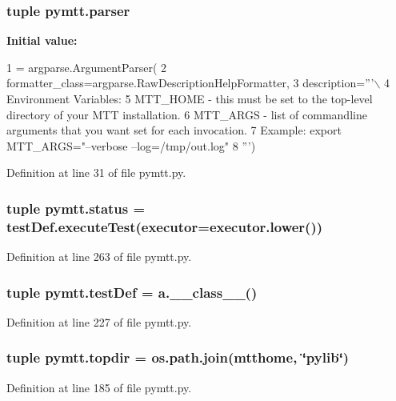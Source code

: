 \hypertarget{namespacepymtt_a95d54fdad48aac280be9d57cf81dee68}{
\subsubsection[{parser}]{\setlength{\rightskip}{0pt plus 5cm}tuple pymtt.\-parser}}\label{namespacepymtt_a95d54fdad48aac280be9d57cf81dee68}
{\bfseries Initial value\-:}
\begin{DoxyCode}
1 = argparse.ArgumentParser(
2     formatter\_class=argparse.RawDescriptionHelpFormatter,
3     description=\textcolor{stringliteral}{'''\(\backslash\)}
4 \textcolor{stringliteral}{Environment Variables:}
5 \textcolor{stringliteral}{  MTT\_HOME - this must be set to the top-level directory of your MTT installation.}
6 \textcolor{stringliteral}{  MTT\_ARGS - list of commandline arguments that you want set for each invocation.}
7 \textcolor{stringliteral}{    Example: export MTT\_ARGS="--verbose --log=/tmp/out.log"}
8 \textcolor{stringliteral}{'''})
\end{DoxyCode}


Definition at line 31 of file pymtt.\-py.

\hypertarget{namespacepymtt_a1a2fd13626c1c2d248cedc138e8660ec}{
\subsubsection[{status}]{\setlength{\rightskip}{0pt plus 5cm}tuple pymtt.\-status = test\-Def.\-execute\-Test({\bf executor}=executor.\-lower())}}\label{namespacepymtt_a1a2fd13626c1c2d248cedc138e8660ec}


Definition at line 263 of file pymtt.\-py.

\hypertarget{namespacepymtt_afebe539e6104da8ebd3d06b7a0e77fe7}{
\subsubsection[{test\-Def}]{\setlength{\rightskip}{0pt plus 5cm}tuple pymtt.\-test\-Def = a.\-\_\-\-\_\-class\-\_\-\-\_\-()}}\label{namespacepymtt_afebe539e6104da8ebd3d06b7a0e77fe7}


Definition at line 227 of file pymtt.\-py.

\hypertarget{namespacepymtt_ac673c895b8c93a029d2a1655c04af315}{
\subsubsection[{topdir}]{\setlength{\rightskip}{0pt plus 5cm}tuple pymtt.\-topdir = os.\-path.\-join({\bf mtthome}, \char`\"{}pylib\char`\"{})}}\label{namespacepymtt_ac673c895b8c93a029d2a1655c04af315}


Definition at line 185 of file pymtt.\-py.

